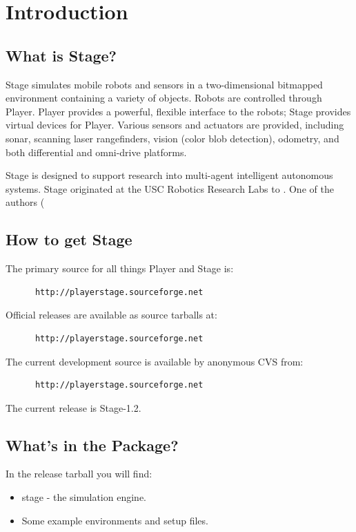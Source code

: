 \documentclass[11pt]{report}
\def\VERSION {1.2}
\begin{document}
\chapter{Introduction}

  \section{What is Stage?}

    Stage simulates mobile robots and sensors in a two-dimensional
    bitmapped environment containing a variety of objects. Robots are
    controlled through Player. Player provides a powerful, flexible
    interface to the robots; Stage provides virtual devices for
    Player.  Various sensors and actuators are provided, including
    sonar, scanning laser rangefinders, vision (color blob detection),
    odometry, and both differential and omni-drive platforms.

	Stage is designed to support research into multi-agent
    intelligent autonomous systems.  Stage originated at the USC
    Robotics Research Labs to . One of the authors (

  \section{How to get Stage}

    The primary source for all things Player and Stage is:
      \begin{verbatim}
      http://playerstage.sourceforge.net
      \end{verbatim}	
   Official releases are available as source tarballs at:
      \begin{verbatim}
      http://playerstage.sourceforge.net
      \end{verbatim}
   The current development source is available by anonymous CVS from:
      \begin{verbatim}
      http://playerstage.sourceforge.net
      \end{verbatim}
The current release is Stage-\VERSION.

  \section{What's in the Package?}

    In the release tarball you will find:
      \begin{itemize}    
      \item stage    - the simulation engine.
      \item Some example environments and setup files.
      \end{itemize}
\end{document}
